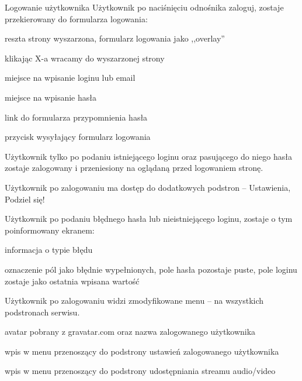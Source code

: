 \begin{userstory}{Logowanie użytkownika}
    Użytkownik po naciśnięciu odnośnika zaloguj,
    zostaje przekierowany do formularza logowania:
    \begin{packed_enum}
        \item reszta strony wyszarzona, formularz logowania jako ,,overlay''
        \item klikając X-a wracamy do wyszarzonej strony
        \item miejsce na wpisanie loginu lub email
        \item miejsce na wpisanie hasła
        \item link do formularza przypomnienia hasła
        \item przycisk wysyłający formularz logowania
    \end{packed_enum}
    
    \begin{tests}
        \item{
            Użytkownik tylko po podaniu istniejącego loginu oraz pasującego do niego hasła
            zostaje zalogowany i przeniesiony na oglądaną przed logowaniem stronę.
        }
        \item{
            Użytkownik po zalogowaniu ma dostęp do dodatkowych podstron -- Ustawienia, Podziel się!
        }
        \item{
            Użytkownik po podaniu błędnego hasła lub nieistniejącego loginu, zostaje o tym poinformowany ekranem:
            \begin{packed_enum}
                \item informacja o typie błędu
                \item oznaczenie pól jako błędnie wypełnionych, pole hasła pozostaje puste, pole loginu zostaje jako ostatnia wpisana wartość
            \end{packed_enum}
        }
        \item{
            Użytkownik po zalogowaniu widzi zmodyfikowane menu -- na wszystkich podstronach serwisu.
            \begin{packed_enum}
                \item avatar pobrany z gravatar.com oraz nazwa zalogowanego użytkownika
                \item wpis w menu przenoszący do podstrony ustawień zalogowanego użytkownika
                \item wpis w menu przenoszący do podstrony udostępniania streamu audio/video
            \end{packed_enum}
        }
    \end{tests}
\end{userstory}

